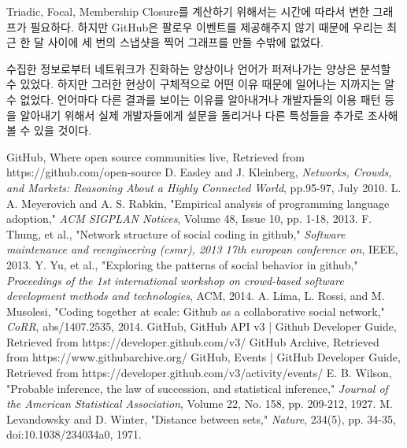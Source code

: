 \documentclass[10pt, a4paper, titlepage]{article}
\begin{document}
Triadic, Focal, Membership Closure를 계산하기 위해서는 시간에 따라서 변한 그래프가 필요하다. 하지만 GitHub은 팔로우 이벤트를 제공해주지 않기 때문에 우리는 최근 한 달 사이에 세 번의 스냅샷을 찍어 그래프를 만들 수밖에 없었다. 

수집한 정보로부터 네트워크가 진화하는 양상이나 언어가 퍼져나가는 양상은 분석할 수 있었다. 하지만 그러한 현상이 구체적으로 어떤 이유 때문에 일어나는 지까지는 알 수 없었다. 언어마다 다른 결과를 보이는 이유를 알아내거나 개발자들의 이용 패턴 등을 알아내기 위해서 실제 개발자들에게 설문을 돌리거나 다른 특성들을 추가로 조사해볼 수 있을 것이다.



\begin{thebibliography}{9}
 GitHub, Where open source communities live, Retrieved from https://github.com/open-source 
 D. Easley and J. Kleinberg, \emph{Networks, Crowds, and Markets: Reasoning About a Highly Connected World}, pp.95-97, July 2010.
 L. A. Meyerovich and A. S. Rabkin, "Empirical analysis of programming language adoption," \emph{ACM SIGPLAN Notices}, Volume 48, Issue 10, pp. 1-18, 2013.
 F. Thung, et al., "Network structure of social coding in github," \emph{Software maintenance and reengineering (csmr), 2013 17th european conference on}, IEEE, 2013.
 Y. Yu, et al., "Exploring the patterns of social behavior in github," \emph{Proceedings of the 1st international workshop on crowd-based software development methods and technologies}, ACM, 2014.
 A. Lima, L. Rossi, and M. Musolesi, "Coding together at scale: Github as a collaborative social network," \emph{CoRR}, abs/1407.2535, 2014.
 GitHub, GitHub API v3 | Github Developer Guide, Retrieved from https://developer.github.com/v3/
 GitHub Archive, Retrieved from https://www.githubarchive.org/
 GitHub, Events | GitHub Developer Guide, Retrieved from https://developer.github.com/v3/activity/events/
 E. B. Wilson, "Probable inference, the law of succession, and statistical inference," \emph{Journal of the American Statistical Association}, Volume 22, No. 158, pp. 209-212, 1927.
 M. Levandowsky and D. Winter, "Distance between sets," \emph{Nature}, 234(5), pp. 34-35, doi:10.1038/234034a0, 1971.

\end{thebibliography}
\end{document}
